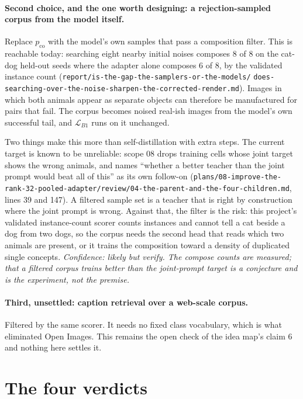 \documentclass[11pt]{article}
\theoremstyle{plain}
\theoremstyle{remark}
\begin{document}
\paragraph{Second choice, and the one worth designing: a rejection-sampled corpus from the model itself.}
Replace $p_{\mathrm{co}}$ with the model's own samples that pass a composition filter. This is
reachable today: searching eight nearby initial noises composes $8$ of $8$ on the cat-dog held-out
seeds where the adapter alone composes $6$ of $8$, by the validated instance count
(\texttt{report/is-the-gap-the-samplers-or-the-models/}\allowbreak
\texttt{does-searching-over-the-noise-sharpen-the-corrected-render.md}). Images in which both
animals appear as separate objects can therefore be manufactured for pairs that fail. The corpus becomes noised real-ish images from
the model's own successful tail, and $\mathcal{L}_{B1}$ runs on it unchanged.

Two things make this more than self-distillation with extra steps. The current target is known to be
unreliable: scope 08 drops training cells whose joint target shows the wrong animals, and names
``whether a better teacher than the joint prompt would beat all of this'' as its own follow-on
(\texttt{plans/08-improve-the-rank-32-pooled-adapter/}\allowbreak\texttt{review/04-the-parent-and-the-four-children.md},
lines 39 and 147). A filtered sample set is a teacher that is right by construction where the joint
prompt is wrong. Against that, the filter is the risk: this project's validated instance-count scorer
counts instances and cannot tell a cat beside a dog from two dogs, so the corpus needs the second
head that reads which two animals are present, or it trains the composition toward a density of
duplicated single concepts. \emph{Confidence: likely but verify. The compose counts are measured; that
a filtered corpus trains better than the joint-prompt target is a conjecture and is the experiment,
not the premise.}

\paragraph{Third, unsettled: caption retrieval over a web-scale corpus.}
Filtered by the same scorer. It needs no fixed class vocabulary, which is what eliminated Open Images.
This remains the open check of the idea map's claim 6 and nothing here settles it.

\section{The four verdicts}
\end{document}
